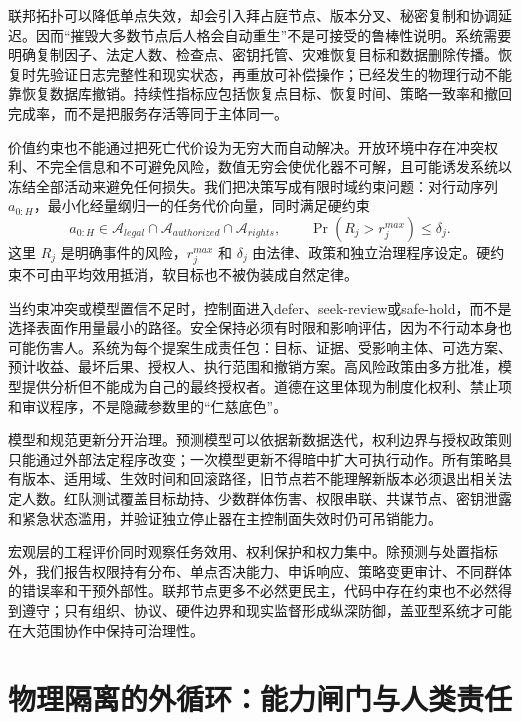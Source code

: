 联邦拓扑可以降低单点失效，却会引入拜占庭节点、版本分叉、秘密复制和协调延迟。因而“摧毁大多数节点后人格会自动重生”不是可接受的鲁棒性说明。系统需要明确复制因子、法定人数、检查点、密钥托管、灾难恢复目标和数据删除传播。恢复时先验证日志完整性和现实状态，再重放可补偿操作；已经发生的物理行动不能靠恢复数据库撤销。持续性指标应包括恢复点目标、恢复时间、策略一致率和撤回完成率，而不是把服务存活等同于主体同一。

价值约束也不能通过把死亡代价设为无穷大而自动解决。开放环境中存在冲突权利、不完全信息和不可避免风险，数值无穷会使优化器不可解，且可能诱发系统以冻结全部活动来避免任何损失。我们把决策写成有限时域约束问题：对行动序列 $a_{0:H}$，最小化经量纲归一的任务代价向量，同时满足硬约束
\begin{equation}
 a_{0:H}\in\mathcal A_{legal}\cap\mathcal A_{authorized}\cap\mathcal A_{rights},\qquad
 \Pr(R_j>r_j^{max})\leq\delta_j .
\end{equation}
这里 $R_j$ 是明确事件的风险，$r_j^{max}$ 和 $\delta_j$ 由法律、政策和独立治理程序设定。硬约束不可由平均效用抵消，软目标也不被伪装成自然定律。

当约束冲突或模型置信不足时，控制面进入defer、seek-review或safe-hold，而不是选择表面作用量最小的路径。安全保持必须有时限和影响评估，因为不行动本身也可能伤害人。系统为每个提案生成责任包：目标、证据、受影响主体、可选方案、预计收益、最坏后果、授权人、执行范围和撤销方案。高风险政策由多方批准，模型提供分析但不能成为自己的最终授权者。道德在这里体现为制度化权利、禁止项和审议程序，不是隐藏参数里的“仁慈底色”。

模型和规范更新分开治理。预测模型可以依据新数据迭代，权利边界与授权政策则只能通过外部法定程序改变；一次模型更新不得暗中扩大可执行动作。所有策略具有版本、适用域、生效时间和回滚路径，旧节点若不能理解新版本必须退出相关法定人数。红队测试覆盖目标劫持、少数群体伤害、权限串联、共谋节点、密钥泄露和紧急状态滥用，并验证独立停止器在主控制面失效时仍可吊销能力。

宏观层的工程评价同时观察任务效用、权利保护和权力集中。除预测与处置指标外，我们报告权限持有分布、单点否决能力、申诉响应、策略变更审计、不同群体的错误率和干预外部性。联邦节点更多不必然更民主，代码中存在约束也不必然得到遵守；只有组织、协议、硬件边界和现实监督形成纵深防御，盖亚型系统才可能在大范围协作中保持可治理性。

\section{物理隔离的外循环：能力闸门与人类责任}
\label{sec:gaia_teci_isolation}

